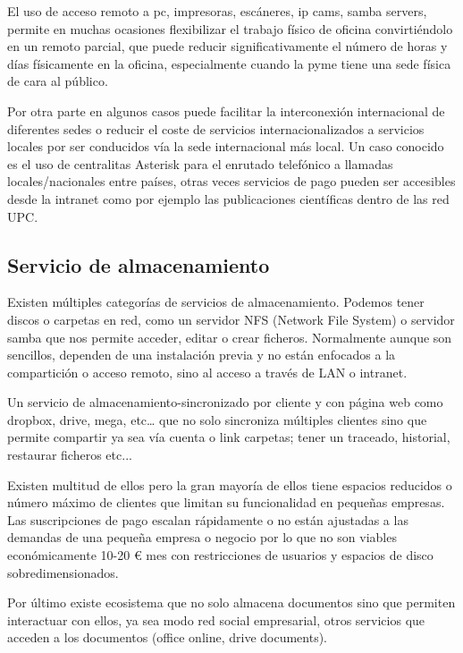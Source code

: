 El uso de acceso remoto a pc, impresoras, escáneres, ip cams, samba servers, permite en muchas ocasiones flexibilizar el trabajo físico de oficina convirtiéndolo en un remoto parcial, que puede reducir significativamente el número de horas y días físicamente en la oficina, especialmente cuando la pyme tiene una sede física de cara al público.

Por otra parte en algunos casos puede facilitar la interconexión internacional de diferentes sedes o reducir el coste de servicios internacionalizados a servicios locales por ser conducidos vía la sede internacional más local.  Un caso conocido es el uso de centralitas Asterisk\cite{c_asterisk} para el enrutado telefónico a llamadas locales/nacionales entre países,  otras veces servicios de pago pueden ser accesibles desde la intranet como por ejemplo las publicaciones científicas dentro de las red UPC.


\subsection{Servicio de almacenamiento}
Existen múltiples categorías de servicios de almacenamiento. Podemos tener discos o carpetas en red, como un servidor NFS (Network File System) o servidor samba\cite{c_samba} que nos permite acceder, editar o crear ficheros. Normalmente aunque son sencillos, dependen de una instalación previa y no están enfocados a la compartición o acceso remoto, sino al acceso a través de LAN o intranet.

Un servicio de almacenamiento-sincronizado por cliente y con página web como dropbox\cite{c_dropbox}, drive\cite{c_drive}, mega\cite{c_mega}, etc… que no solo sincroniza múltiples clientes sino que permite compartir ya sea vía cuenta o link carpetas; tener un traceado, historial, restaurar ficheros etc...

Existen multitud de ellos pero la gran mayoría de ellos tiene espacios reducidos o número máximo de clientes que limitan su funcionalidad en pequeñas empresas. Las suscripciones de pago escalan rápidamente o no están ajustadas a las demandas de una pequeña empresa o negocio por lo que no son viables económicamente 10-20 € mes con restricciones de usuarios y espacios de disco sobredimensionados.

Por último existe ecosistema que no solo almacena documentos sino que permiten interactuar con ellos, ya sea modo red social empresarial, otros servicios que acceden a los documentos (office online, drive documents).

